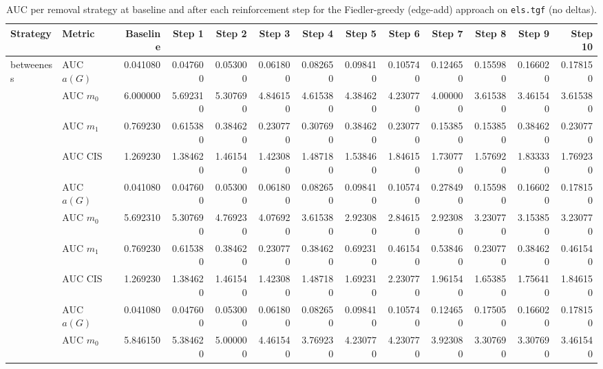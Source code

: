 \begin{table}[htbp]
  \centering
  \caption{AUC per removal strategy at baseline and after each reinforcement step for the Fiedler-greedy (edge-add) approach on \texttt{els.tgf} (no deltas).}
  \label{tab:els-fiedler_greedy-auc}
\setlength{\tabcolsep}{2.5pt}
  \begin{tabular}{llrrrrrrrrrrr}
    \toprule
    \textbf{Strategy} & \textbf{Metric} & \textbf{Baseline} & \textbf{Step 1} & \textbf{Step 2} & \textbf{Step 3} & \textbf{Step 4} & \textbf{Step 5} & \textbf{Step 6} & \textbf{Step 7} & \textbf{Step 8} & \textbf{Step 9} & \textbf{Step 10} \\
    \midrule
    \multirow{4}{*}{betweeness} & AUC $a(G)$ & 0.041080 & 0.047600 & 0.053000 & 0.061800 & 0.082650 & 0.098410 & 0.105740 & 0.124650 & 0.155980 & 0.166020 & 0.178150 \\
    & AUC $m_0$ & 6.000000 & 5.692310 & 5.307690 & 4.846150 & 4.615380 & 4.384620 & 4.230770 & 4.000000 & 3.615380 & 3.461540 & 3.615380 \\
    & AUC $m_1$ & 0.769230 & 0.615380 & 0.384620 & 0.230770 & 0.307690 & 0.384620 & 0.230770 & 0.153850 & 0.153850 & 0.384620 & 0.230770 \\
    & AUC CIS & 1.269230 & 1.384620 & 1.461540 & 1.423080 & 1.487180 & 1.538460 & 1.846150 & 1.730770 & 1.576920 & 1.833330 & 1.769230 \\
    \addlinespace
    \multirow{4}{*}{closeness} & AUC $a(G)$ & 0.041080 & 0.047600 & 0.053000 & 0.061800 & 0.082650 & 0.098410 & 0.105740 & 0.278490 & 0.155980 & 0.166020 & 0.178150 \\
    & AUC $m_0$ & 5.692310 & 5.307690 & 4.769230 & 4.076920 & 3.615380 & 2.923080 & 2.846150 & 2.923080 & 3.230770 & 3.153850 & 3.230770 \\
    & AUC $m_1$ & 0.769230 & 0.615380 & 0.384620 & 0.230770 & 0.384620 & 0.692310 & 0.461540 & 0.538460 & 0.230770 & 0.384620 & 0.461540 \\
    & AUC CIS & 1.269230 & 1.384620 & 1.461540 & 1.423080 & 1.487180 & 1.692310 & 2.230770 & 1.961540 & 1.653850 & 1.756410 & 1.846150 \\
    \addlinespace
    \multirow{4}{*}{core influence} & AUC $a(G)$ & 0.041080 & 0.047600 & 0.053000 & 0.061800 & 0.082650 & 0.098410 & 0.105740 & 0.124650 & 0.175050 & 0.166020 & 0.178150 \\
    & AUC $m_0$ & 5.846150 & 5.384620 & 5.000000 & 4.461540 & 3.769230 & 4.230770 & 4.230770 & 3.923080 & 3.307690 & 3.307690 & 3.461540 \\

\end{tabular}
\end{table}
